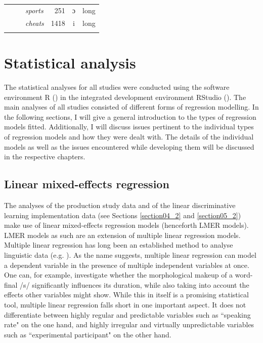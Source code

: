 \begin{table}
\begin{tabular}{lllrcl}
                                                                & ~                                                    & \textit{sports}  & 251       & ɔ     & long          \\
                                                                & ~                                                    & \textit{cheats}    & 1418      & i     & long          \\
\lspbottomrule
\end{tabular}
\end{table}

\section{Statistical analysis}\label{section03_2}

The statistical analyses for all studies were conducted using the software environment R (\cite{RCore2020}) in the integrated development environment RStudio (\cite{RStudio2020}). The main analyses of all studies consisted of different forms of regression modelling. In the following sections, I will give a general introduction to the types of regression models fitted. Additionally, I will discuss issues pertinent to the individual types of regression models and how they were dealt with. The details of the individual models as well as the issues encountered while developing them will be discussed in the respective chapters.

\subsection{Linear mixed-effects regression}\label{section03_2_1}

The analyses of the production study data and of the linear discriminative learning implementation data (see Sections \ref{section04_2} and \ref{section05_2}) make use of linear mixed-effects regression models (henceforth LMER models). LMER models as such are an extension of multiple linear regression models. Multiple linear regression has long been an established method to analyse linguistic data (e.g. \cite{Baayen2008, Winter2019}). As the name suggests, multiple linear regression can model a dependent variable in the presence of multiple independent variables at once. One can, for example, investigate whether the morphological makeup of a word-final /s/ significantly influences its duration, while also taking into account the effects other variables might show. While this in itself is a promising statistical tool, multiple linear regression falls short in one important aspect. It does not differentiate between highly regular and predictable variables such as ``speaking rate" on the one hand, and highly irregular and virtually unpredictable variables such as ``experimental participant" on the other hand. 

